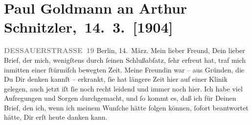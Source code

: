 

         
         \renewcommand{\erwaehntePersonen}{Personen: Paul Goldmann, Theodore Rottenberg, Olga Schnitzler, Heinrich Schnitzler}
         \renewcommand{\erwaehnteOrte}{Orte: Berlin, Dessauer Straße, Deutsches Theater Berlin, Italien, Neapel, Palermo, Pompeji, Rom, Sizilien, Taormina, Wien}
         \renewcommand{\erwaehnteWerke}{Werke: Berliner Theater. »Der einsame Weg«. Von Arthur Schnitzler, Der einsame Weg. Schauspiel in fünf Akten, Neue Freie Presse}
               \section[ Paul Goldmann an Arthur Schnitzler, 14. 3. {[}1904{]}]{ Paul Goldmann an Arthur Schnitzler, 14. 3. {[}1904{]}}\nopagebreak{}\rehead{ }\begin{ledgroupsized}[t]{13cm}\normalsize\beginnumbering{} \toendnotes[C]{\smallbreak\pagebreak[2]} 
\toendnotes[C]{\smallbreak}\pstart
           \noindent{}\raggedleft{}{\pb}\textcolor{gray}{\textbf{DESSAUERSTRASSE 19}}\pend
           \pstart
           Berlin, 14. März.\pend
           \pstart{}Mein lieber Freund,\pend\pstart
           Dein lieber Brief, der mich, wenigſtens durch ſeinen Schlußabſatz, ſehr erfreut hat,
               traf mich inmitten einer ſtürmiſch  bewegten Zeit.
               Meine Freundin war – aus
               Gründen, die Du Dir denken kannſt – erkrankt,  ſie
               hat längere Zeit hier auf einer
               Klinik gelegen, auch jetzt iſt ſie noch recht leidend und immer noch hier. Ich habe
               viel Aufregungen und Sorgen durchgemacht, und ſo kommt es, daß ich \introOben{}für\introOben{} Deinen Brief, den ich, wenn ich meinem Wunſche hätte \strikeout{\textcolor{gray}{erf}} folgen können, ſofort beantwortet hätte, Dir erſt heute danken kann.\pend

\end{ledgroupsized}
